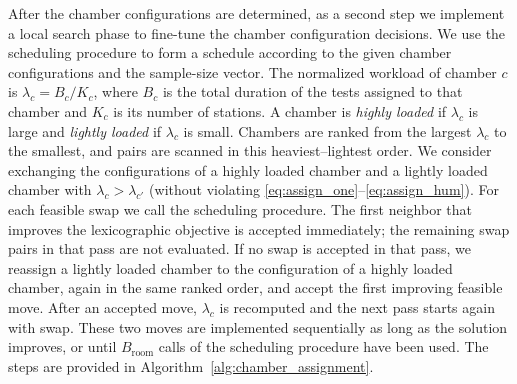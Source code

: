 After the chamber configurations are determined, as a second step we implement a local search phase to fine-tune the chamber configuration decisions. We use the scheduling procedure to form a schedule according to the given chamber configurations and the sample-size vector. The normalized workload of chamber \(c\) is \(\lambda_c=B_c/K_c\), where \(B_c\) is the total duration of the tests assigned to that chamber and \(K_c\) is its number of stations. A chamber is \emph{highly loaded} if \(\lambda_c\) is large and \emph{lightly loaded} if \(\lambda_c\) is small. Chambers are ranked from the largest \(\lambda_c\) to the smallest, and pairs are scanned in this heaviest--lightest order. We consider exchanging the configurations of a highly loaded chamber and a lightly loaded chamber with \(\lambda_c>\lambda_{c'}\) (without violating \eqref{eq:assign_one}--\eqref{eq:assign_hum}). For each feasible swap we call the scheduling procedure. The first neighbor that improves the lexicographic objective is accepted immediately; the remaining swap pairs in that pass are not evaluated. If no swap is accepted in that pass, we reassign a lightly loaded chamber to the configuration of a highly loaded chamber, again in the same ranked order, and accept the first improving feasible move. After an accepted move, \(\lambda_c\) is recomputed and the next pass starts again with swap. These two moves are implemented sequentially as long as the solution improves, or until \(B_{\mathrm{room}}\) calls of the scheduling procedure have been used. The steps are provided in Algorithm~\ref{alg:chamber_assignment}.

